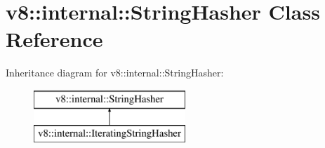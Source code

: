 \hypertarget{classv8_1_1internal_1_1_string_hasher}{}\section{v8\+:\+:internal\+:\+:String\+Hasher Class Reference}
\label{classv8_1_1internal_1_1_string_hasher}
Inheritance diagram for v8\+:\+:internal\+:\+:String\+Hasher\+:\begin{figure}[H]
\begin{center}
\leavevmode
\includegraphics[height=2.000000cm]{classv8_1_1internal_1_1_string_hasher}
\end{center}
\end{figure}
